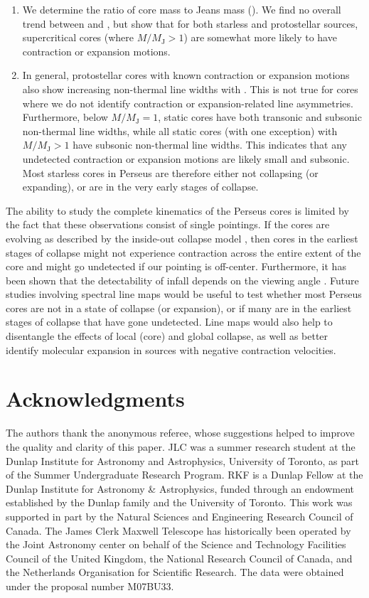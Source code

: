 \documentclass[iop,twocolappendix]{emulateapj}
\begin{document}
\begin{enumerate}
\item We determine the ratio of core mass to Jeans mass (\MJ). We find no overall trend between {\Vin} and \MMJ, but show that for both starless and protostellar sources, supercritical cores (where $M/M_\mathrm{J} > 1$) are somewhat more likely to have contraction or expansion motions.  

\item In general, protostellar cores with known contraction or expansion motions also show increasing non-thermal line widths with \MMJ. This is not true for cores where we do not identify contraction or expansion-related line asymmetries. Furthermore, below $M/M_\mathrm{J} = 1$, static cores have both transonic and subsonic non-thermal line widths, while all static cores (with one exception) with $M/M_\mathrm{J} > 1$ have subsonic non-thermal line widths. This indicates that any undetected contraction or expansion motions are likely small and subsonic. Most starless cores in Perseus are therefore either not collapsing (or expanding), or are in the very early stages of collapse.

\end{enumerate}

The ability to study the complete kinematics of the Perseus cores is limited by the fact that these observations consist of single pointings. If the cores are evolving as described by the inside-out collapse model \citep{Shu1977}, then cores in the earliest stages of collapse might not experience contraction across the entire extent of the core and might go undetected if our pointing is off-center. Furthermore, it has been shown that the detectability of infall depends on the viewing angle \citep{Smith2012}. Future studies involving spectral line maps would be useful to test whether most Perseus cores are not in a state of collapse (or expansion), or if many are in the earliest stages of collapse that have gone undetected. Line maps would also help to disentangle the effects of local (core) and global collapse, as well as better identify molecular expansion in sources with negative contraction velocities.


\section*{Acknowledgments}

The authors thank the anonymous referee, whose suggestions helped to improve the quality and clarity of this paper. JLC was a summer research student at the Dunlap Institute for Astronomy and Astrophysics, University of Toronto, as part of the Summer Undergraduate Research Program. RKF is a Dunlap Fellow at the Dunlap Institute for Astronomy \& Astrophysics, funded through an endowment established by the Dunlap family and the University of Toronto. This work was supported in part by the Natural Sciences and Engineering Research Council of Canada. The James Clerk Maxwell Telescope has historically been operated by the Joint Astronomy center on behalf of the Science and Technology Facilities Council of the United Kingdom, the National Research Council of Canada, and the Netherlands Organisation for Scientific Research. The data were obtained under the proposal number M07BU33.
\end{document}
